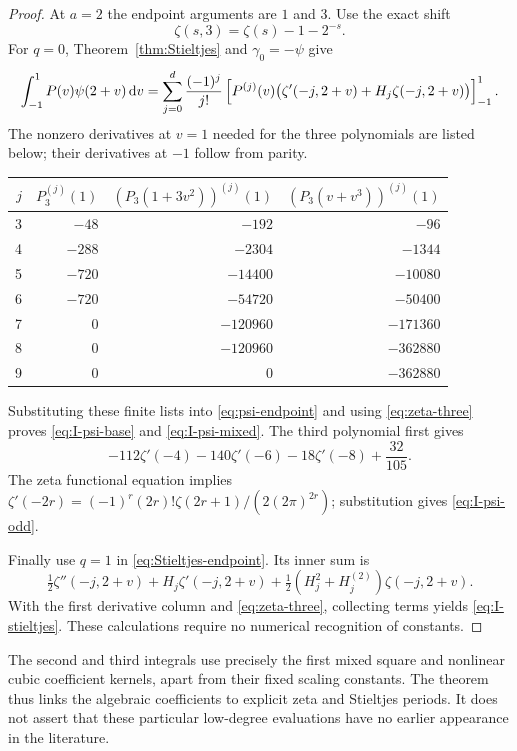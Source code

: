 \begin{proof}
At $a=2$ the endpoint arguments are $1$ and $3$. Use the exact shift
\begin{equation}\label{eq:zeta-three}
 \zeta(s,3)=\zeta(s)-1-2^{-s}.
\end{equation}
For $q=0$, Theorem~\ref{thm:Stieltjes} and $\gamma_0=-\psi$ give
\begin{equation}\label{eq:psi-endpoint}
 \int_{-1}^1P(v)\psi(2+v)\,\mathrm d v
 =\sum_{j=0}^d\frac{(-1)^j}{j!}
 \left[P^{(j)}(v)\bigl(\zeta'(-j,2+v)+H_j\zeta(-j,2+v)\bigr)\right]_{-1}^{1}.
\end{equation}
The nonzero derivatives at $v=1$ needed for the three polynomials are
listed below; their derivatives at $-1$ follow from parity.
\begin{center}\small
\begin{tabular}{r|rrr}
\toprule
$j$ & $P_3^{(j)}(1)$ & $(P_3(1+3v^2))^{(j)}(1)$
    & $(P_3(v+v^3))^{(j)}(1)$\\
\midrule
3 & $-48$ & $-192$ & $-96$\\
4 & $-288$ & $-2304$ & $-1344$\\
5 & $-720$ & $-14400$ & $-10080$\\
6 & $-720$ & $-54720$ & $-50400$\\
7 & $0$ & $-120960$ & $-171360$\\
8 & $0$ & $-120960$ & $-362880$\\
9 & $0$ & $0$ & $-362880$\\
\bottomrule
\end{tabular}
\end{center}
Substituting these finite lists into \eqref{eq:psi-endpoint} and using
\eqref{eq:zeta-three} proves \eqref{eq:I-psi-base} and
\eqref{eq:I-psi-mixed}. The third polynomial first gives
\[
 -112\zeta'(-4)-140\zeta'(-6)-18\zeta'(-8)+\frac{32}{105}.
\]
The zeta functional equation implies
$\zeta'(-2r)=(-1)^r(2r)!\zeta(2r+1)/(2(2\pi)^{2r})$;
substitution gives \eqref{eq:I-psi-odd}.

Finally use $q=1$ in \eqref{eq:Stieltjes-endpoint}. Its inner sum is
\[
 \tfrac12\zeta''(-j,2+v)+H_j\zeta'(-j,2+v)
 +\tfrac12(H_j^2+H_j^{(2)})\zeta(-j,2+v).
\]
With the first derivative column and \eqref{eq:zeta-three}, collecting
terms yields \eqref{eq:I-stieltjes}. These calculations require no
numerical recognition of constants.
\end{proof}

The second and third integrals use precisely the first mixed square and
nonlinear cubic coefficient kernels, apart from their fixed scaling
constants. The theorem thus links the algebraic coefficients to explicit
zeta and Stieltjes periods. It does not assert that these particular
low-degree evaluations have no earlier appearance in the literature.
